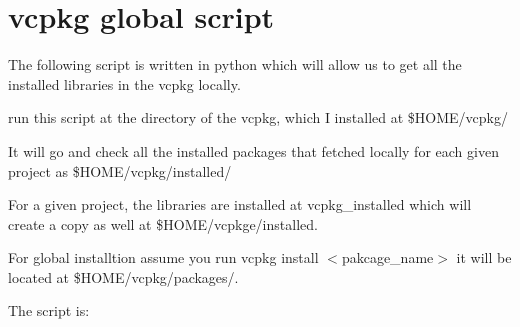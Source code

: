 \chapter{vcpkg global script}
\hypertarget{md_docs_2own__docs_2vcpkg__premier_2vcpkg__global__library__script}{}\label{md_docs_2own__docs_2vcpkg__premier_2vcpkg__global__library__script}
\label{md_docs_2own__docs_2vcpkg__premier_2vcpkg__global__library__script_autotoc_md258}%
%

\begin{DoxyItemize}
\item The following script is written in {\ttfamily python} which will allow us to get all the installed libraries in the {\ttfamily vcpkg} locally.
\begin{DoxyItemize}
\item run this script at the directory of the {\ttfamily vcpkg}, which I installed at {\ttfamily \$HOME/vcpkg/}
\item It will go and check all the installed packages that fetched locally for each given project as {\ttfamily \$HOME/vcpkg/installed/}
\item For a given project, the libraries are installed at {\ttfamily vcpkg\+\_\+installed} which will create a copy as well at {\ttfamily \$HOME/vcpkge/installed}.
\item For global installtion assume you run {\ttfamily vcpkg install \texorpdfstring{$<$}{<}pakcage\+\_\+name\texorpdfstring{$>$}{>}} it will be located at {\ttfamily \$HOME/vcpkg/packages/}.
\end{DoxyItemize}
\item The script is\+:
\end{DoxyItemize}


